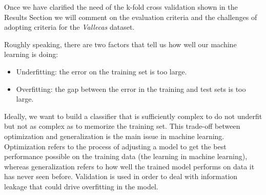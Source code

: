 \documentclass[11pt]{article}
\theoremstyle{definition}
\theoremstyle{remark}
\begin{document}
Once we have clarified the need of the k-fold cross validation shown in the Results Section we will comment on the evaluation criteria and the challenges of adopting criteria for the \emph{Vallecas} dataset.

Roughly speaking, there are two factors that tell us how well our machine learning is doing:
\begin{itemize}
\item Underfitting: the error on the training set is too large.
\item Overfitting: the gap between the error in the training and test sets is too large. 
\end{itemize}

Ideally, we want to build a classifier that is sufficiently complex to do not underfit but not as complex as to memorize the training set. This trade-off between optimization and generalization is the main issue in machine learning. Optimization refers to the process of adjusting a model to get the best performance possible on the training data (the learning in machine learning), whereas generalization refers to how well the trained model performs on data it has never seen before. Validation is used in order to deal with information leakage that could drive overfitting in the model.
\end{document}
